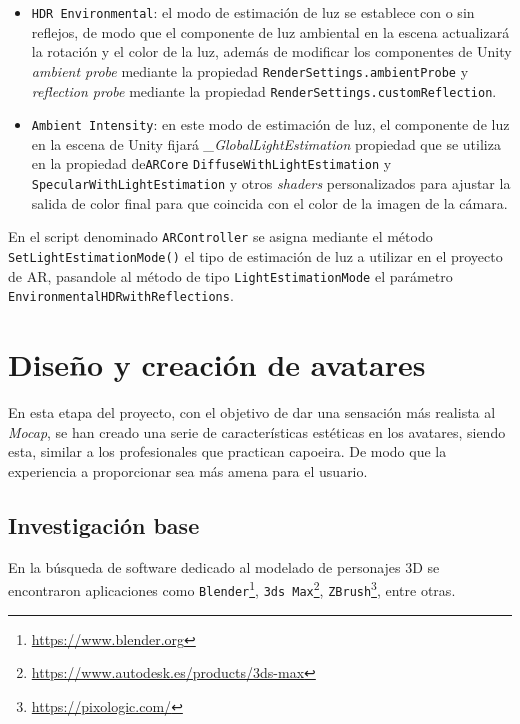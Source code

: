 \begin{itemize}
    \item \texttt{HDR Environmental}: el modo de estimación de luz se establece con o sin reflejos, de modo que el componente de luz ambiental en la escena actualizará la rotación y el color de la luz, además de modificar los componentes de Unity \textit{ambient probe} mediante la propiedad \texttt{RenderSettings.ambientProbe} y \textit{ reflection probe } mediante la propiedad \texttt{RenderSettings.customReflection}.
    \item \texttt{Ambient Intensity}: en este modo de estimación de luz, el componente de luz en la escena de Unity fijará \textit{\_GlobalLightEstimation} propiedad que se utiliza en la propiedad de\texttt{ARCore}  \texttt{DiffuseWithLightEstimation} y \texttt{SpecularWithLightEstimation} y otros \textit{shaders} personalizados para ajustar la salida de color final para que coincida con el color de la imagen de la cámara.
\end{itemize}

En el script denominado \texttt{ARController} se asigna mediante el método \texttt{SetLightEstimationMode()} el tipo de estimación de luz a utilizar en el proyecto de AR, pasandole al método de tipo \texttt{LightEstimationMode} el parámetro \texttt{EnvironmentalHDRwithReflections}.



\section{Diseño y creación de avatares}

En esta etapa del proyecto, con el objetivo de dar una sensación más realista al \textit{Mocap}, se han creado una serie de características estéticas en los avatares, siendo esta, similar a los profesionales que practican capoeira. De modo que la experiencia a proporcionar sea más amena para el usuario.

\subsection{Investigación base} 

En la búsqueda de software dedicado al modelado de personajes 3D se encontraron aplicaciones como \texttt{Blender}\footnote{\url{https://www.blender.org}}, \texttt{3ds Max}\footnote{\url{https://www.autodesk.es/products/3ds-max}}, \texttt{ZBrush}\footnote{\url{https://pixologic.com/}}, entre otras. 

